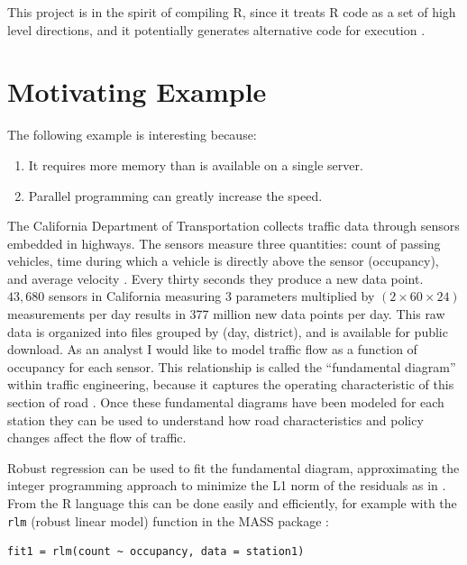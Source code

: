 \documentclass[12pt]{article}
\begin{document}
This project is in the spirit of compiling R, since it treats R code as
a set of high level directions, and it potentially generates alternative
code for execution \cite{lang2014enhancing}.

\section{Motivating Example}
\label{sec:pems}

The following example is interesting because:
\begin{enumerate}
    \item It requires more memory than is available on a single server.
    \item Parallel programming can greatly increase the speed.
\end{enumerate}

The California Department of Transportation collects traffic data through
sensors embedded in highways. The sensors measure three quantities: count
of passing vehicles, time during which a vehicle is directly above the
sensor (occupancy), and average velocity \cite{jia2001pems}.  Every thirty
seconds they produce a new data point. $43,680$ sensors in California
measuring 3 parameters multiplied by $(2 \times 60 \times 24)$ measurements
per day results in 377 million new data points per day.  This raw data is
organized into files grouped by (day, district), and is available for
public download.  As an analyst I would like to model traffic flow as a
function of occupancy for each sensor. This relationship is called the
``fundamental diagram'' within traffic engineering, because it captures the
operating characteristic of this section of road
\cite{daganzo1997fundamentals}. Once these fundamental diagrams have been
modeled for each station they can be used to understand how road
characteristics and policy changes affect the flow of traffic.

Robust regression can be used to fit the fundamental diagram, approximating
the integer programming approach to minimize the L1 norm of the residuals as in
\cite{li2011fundamental}.  From the R language this can be done easily and
efficiently, for example with the \texttt{rlm} (robust linear model)
function in the MASS package \cite{venables2013modern}:

\begin{verbatim}
fit1 = rlm(count ~ occupancy, data = station1)
\end{verbatim}
\end{document}
